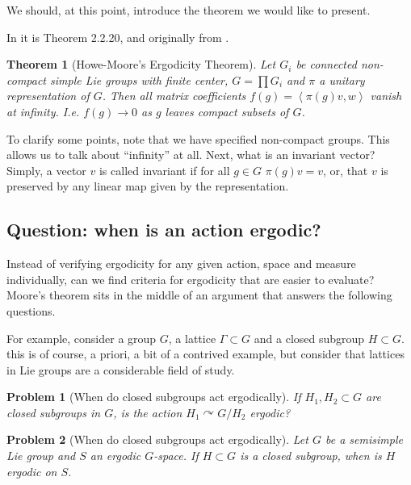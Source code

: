 \documentclass[
  12pt
]{article}
\newtheorem{thm}{Theorem}[section]
\newtheorem*{problem}{Problem}
\theoremstyle{plain}
\newcommand{\G}{\ensuremath{G}\xspace}
\newcommand{\inn}[1]{\left\langle #1 \right\rangle}
\begin{document}
  We should, at this point, introduce the theorem we would like to present.

  In \citeauthor{Zimmer84}\cite{Zimmer84} it is Theorem 2.2.20, and originally from \citeauthor{howe79}\cite{howe79}.

  \begin{thm}[Howe-Moore's Ergodicity Theorem]
    \label{thm:main-thm}
    Let $G_i$ be connected non-compact simple Lie groups with finite center, $G = \prod G_i$ and $\pi$ a unitary representation of \G.
    Then all matrix coefficients $f(g) = \inn{\pi(g)v,w}$ vanish at infinity.
    I.e. $f(g) \rightarrow 0$ as $g$ leaves compact subsets of \G.
  \end{thm}

  To clarify some points, note that we have specified non-compact groups.
  This allows us to talk about ``infinity'' at all. Next, what is an
  invariant vector? Simply, a vector $v$ is called invariant if for all $g\in G$
  $\pi(g)v = v$, or, that $v$ is preserved by any linear map
  given by the representation.

  \hypertarget{question-when-is-an-action-ergodic}{%
  \subsection{Question: when is an action
  ergodic?}\label{question-when-is-an-action-ergodic}}

  Instead of verifying ergodicity for any given action, space and measure
  individually, can we find criteria for ergodicity that are easier to
  evaluate? Moore's theorem sits in the middle of an argument that
  answers the following questions.

  For example, consider a group \G, a lattice $\Gamma \subset G$ and a closed subgroup $H \subset G$.
  this is of course, a priori, a bit of a contrived example, but consider that lattices in Lie groups are a considerable field of study.

  \begin{problem}[When do closed subgroups act ergodically]
    If $H_1, H_2 \subset G$ are closed subgroups in \G, is the action $H_1\curvearrowright G/H_2$ ergodic?
  \end{problem}

  \begin{problem}[When do closed subgroups act ergodically]
    Let \G be a semisimple Lie group and $S$ an ergodic \G-space. If $H\subset G$ is a closed subgroup, when is $H$ ergodic on $S$.
  \end{problem}
\end{document}
